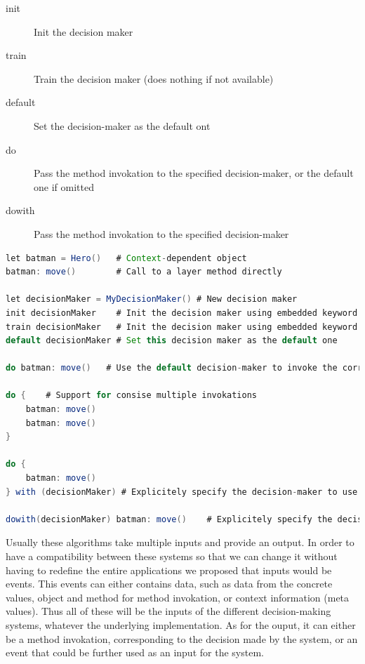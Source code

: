 \documentclass[a4paper]{article}
\begin{document}
\begin{description}
  \item[init] Init the decision maker
  \item[train] Train the decision maker (does nothing if not available)
  \item[default] Set the decision-maker as the default ont
  \item[do] Pass the method invokation to the specified decision-maker, or the default one if omitted
  \item[dowith] Pass the method invokation to the specified decision-maker
\end{description}

\begin{lstlisting}[float, language=Java, caption=ConGolo example, label={listing:congolohero}]
let batman = Hero()   # Context-dependent object
batman: move()        # Call to a layer method directly

let decisionMaker = MyDecisionMaker() # New decision maker
init decisionMaker    # Init the decision maker using embedded keyword
train decisionMaker   # Init the decision maker using embedded keyword
default decisionMaker # Set this decision maker as the default one

do batman: move()	# Use the default decision-maker to invoke the correct method move of Hero

do {	# Support for consise multiple invokations
	batman: move()
	batman: move()
}

do {
	batman: move()
} with (decisionMaker) # Explicitely specify the decision-maker to use

dowith(decisionMaker) batman: move()	# Explicitely specify the decision-maker to use in a consise form
\end{lstlisting}

Usually these algorithms take multiple inputs and provide an output. In order to have a compatibility between these systems so that we can change it without having to redefine the entire applications we proposed that inputs would be events. This events can either contains data, such as data from the concrete values, object and method for method invokation, or context information (meta values). Thus all of these will be the inputs of the different decision-making systems, whatever the underlying implementation. As for the ouput, it can either be a method invokation, corresponding to the decision made by the system, or an event that could be further used as an input for the system.
\end{document}
